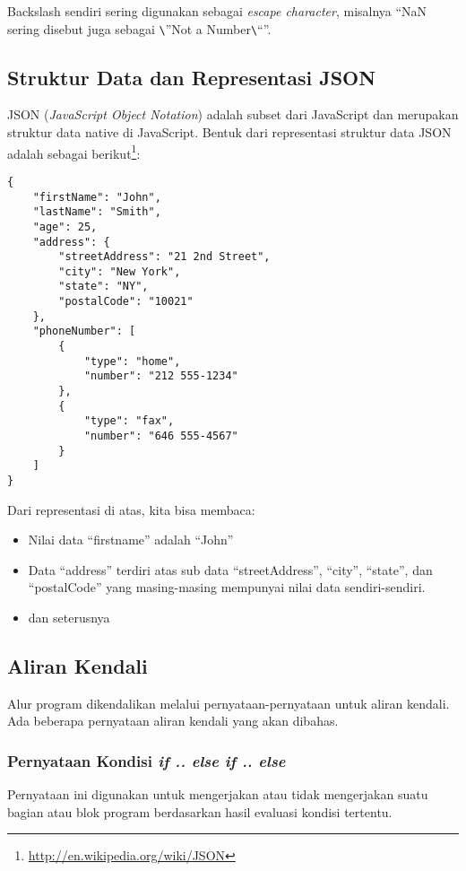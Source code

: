Backslash sendiri sering digunakan sebagai \textit{escape character}, misalnya ``NaN sering disebut juga sebagai \verb+\+''Not a Number\verb+\+``''.

\subsection{Struktur Data dan Representasi JSON}

JSON (\textit{JavaScript Object Notation}) adalah subset dari JavaScript dan merupakan struktur data native di JavaScript. Bentuk dari representasi struktur data JSON adalah sebagai berikut\footnote{\url{http://en.wikipedia.org/wiki/JSON}}:

\begin{lstlisting}
{
    "firstName": "John",
    "lastName": "Smith",
    "age": 25,
    "address": {
        "streetAddress": "21 2nd Street",
        "city": "New York",
        "state": "NY",
        "postalCode": "10021"
    },
    "phoneNumber": [
        {
            "type": "home",
            "number": "212 555-1234"
        },
        {
            "type": "fax",
            "number": "646 555-4567"
        }
    ]
}
\end{lstlisting}

Dari representasi di atas, kita bisa membaca:
\begin{itemize}
  \item Nilai data ``firstname'' adalah ``John''
  \item Data ``address'' terdiri atas sub data ``streetAddress'', ``city'', ``state'', dan ``postalCode'' yang masing-masing mempunyai nilai data sendiri-sendiri.
  \item dan seterusnya
\end{itemize}

\subsection{Aliran Kendali}

Alur program dikendalikan melalui pernyataan-pernyataan untuk aliran kendali. Ada beberapa pernyataan aliran kendali yang akan dibahas.

\subsubsection{Pernyataan Kondisi \textit{if .. else if .. else}}

Pernyataan ini digunakan untuk mengerjakan atau tidak mengerjakan suatu bagian atau blok program berdasarkan hasil evaluasi kondisi tertentu.

